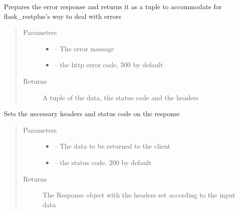\documentclass[letterpaper,10pt,english]{sphinxmanual}
\begin{document}
\begin{fulllineitems}
\label{_source/son_editor.util:son_editor.util.requestutil.prepare_error}
Prepares the error response and returns it as a tuple
to accommodate for flask\_restplus's way to deal with errors
\begin{quote}\begin{description}
\item[{Parameters}] \leavevmode\begin{itemize}
\item {} 
 -- The error message

\item {} 
 -- the http error code, 500 by default

\end{itemize}

\item[{Returns}] \leavevmode
A tuple of the data, the status code and the headers

\end{description}\end{quote}

\end{fulllineitems}


\begin{fulllineitems}
\label{_source/son_editor.util:son_editor.util.requestutil.prepare_response}
Sets the necessary headers and status code on the response
\begin{quote}\begin{description}
\item[{Parameters}] \leavevmode\begin{itemize}
\item {} 
 -- The data to be returned to the client

\item {} 
 -- the status code. 200 by default

\end{itemize}

\item[{Returns}] \leavevmode
The Response object with the headers set according to the input data

\end{description}\end{quote}

\end{fulllineitems}
\end{document}
